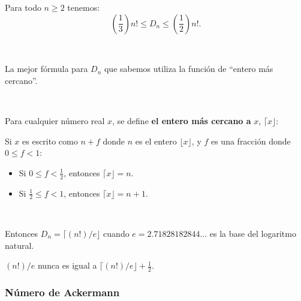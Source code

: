\begin{frame}

\begin{theorem}
Para todo $n\geq2$ tenemos: \[ \left(\frac{1}{3}\right)n!\leq D_{n}\leq\left(\frac{1}{2}\right)n!. \]
\end{theorem}

\

La mejor fórmula para $D_{n}$ que sabemos utiliza la función de ``entero más cercano''.

\

\begin{definition}
	Para cualquier número real $x$, se define \textbf{el entero más cercano a} $x$, $\lceil x\rfloor$:

	Si $x$ es escrito como $n+f$ donde $n$ es el entero $\lfloor x\rfloor$, y $f$ es una fracción donde $0\leq f<1$:

	\begin{itemize}
		\item Si $0\leq f<\frac{1}{2}$, entonces $\lceil x\rfloor=n$.
		\item Si $\frac{1}{2}\leq f<1$, entonces $\lceil x\rfloor=n+1$.
	\end{itemize}
\end{definition}

\

\begin{remark}
	Entonces $D_{n}=\lceil(n!)/e\rfloor$ cuando $e=2.71828182844\ldots$ es la base del logaritmo natural.

	$(n!)/e$  nunca es igual a $\lceil(n!)/e\rfloor+\frac{1}{2}$.
\end{remark}
\end{frame}

\subsubsection{Número de Ackermann}

